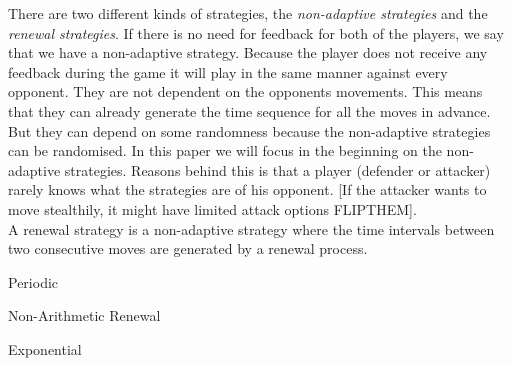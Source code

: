 There are two different kinds of strategies, the \textit{non-adaptive strategies} and the \textit{renewal strategies}. If there is no need for feedback for both of the players, we say that we have a non-adaptive strategy. Because the player does not receive any feedback during the game it will play in the same manner against every opponent. They are not dependent on the opponents movements. This means that they can already generate the time sequence for all the moves in advance.  But they can depend on some randomness because the non-adaptive strategies can be randomised. 
In this paper we will focus in the beginning on the non-adaptive strategies. Reasons behind this is that a player (defender or attacker) rarely knows what the strategies are of his opponent. [If the attacker wants to move stealthily, it might have limited attack options FLIPTHEM]. \\
A renewal strategy is a non-adaptive strategy where the time intervals between two consecutive moves are generated by a renewal process. \\

 \begin{description}
 \item Periodic
 \item Non-Arithmetic Renewal
 \item Exponential
 \end{description}
 



